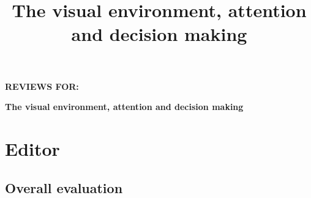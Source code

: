 \documentclass[english,natbib,man,floatsintext]{apa6}
\title{The visual environment, attention and decision making}
\begin{document}



\singlespacing
\begin{center}

{\Large \textbf{REVIEWS FOR:}}

\vspace{1cm}

{\Large \textbf{The visual environment, attention and decision making}}

\vspace{5mm}


\vspace{1cm}
\end{center}



\section{Editor}
\label{rev:editor}

\subsection{Overall evaluation}
\end{document}
